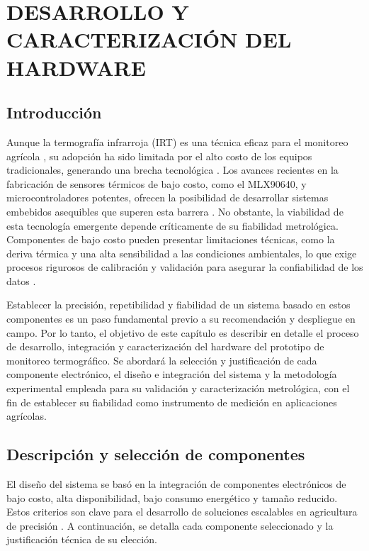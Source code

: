 \chapter{DESARROLLO Y CARACTERIZACIÓN DEL HARDWARE}
\label{chap:hardware} %

\section{Introducción}
\label{sec:hardware_intro}
Aunque la termografía infrarroja (IRT) es una técnica eficaz para el monitoreo agrícola , su adopción ha sido limitada por el alto costo de los equipos tradicionales, generando una brecha tecnológica . Los avances recientes en la fabricación de sensores térmicos de bajo costo, como el MLX90640, y microcontroladores potentes, ofrecen la posibilidad de desarrollar sistemas embebidos asequibles que superen esta barrera . No obstante, la viabilidad de esta tecnología emergente depende críticamente de su fiabilidad metrológica. Componentes de bajo costo pueden presentar limitaciones técnicas, como la deriva térmica y una alta sensibilidad a las condiciones ambientales, lo que exige procesos rigurosos de calibración y validación para asegurar la confiabilidad de los datos .

Establecer la precisión, repetibilidad y fiabilidad de un sistema basado en estos componentes es un paso fundamental previo a su recomendación y despliegue en campo. Por lo tanto, el objetivo de este capítulo es describir en detalle el proceso de desarrollo, integración y caracterización del hardware del prototipo de monitoreo termográfico. Se abordará la selección y justificación de cada componente electrónico, el diseño e integración del sistema y la metodología experimental empleada para su validación y caracterización metrológica, con el fin de establecer su fiabilidad como instrumento de medición en aplicaciones agrícolas.

\section{Descripción y selección de componentes}
\label{sec:hardware_componentes}
El diseño del sistema se basó en la integración de componentes electrónicos de bajo costo, alta disponibilidad, bajo consumo energético y tamaño reducido. Estos criterios son clave para el desarrollo de soluciones escalables en agricultura de precisión . A continuación, se detalla cada componente seleccionado y la justificación técnica de su elección.


